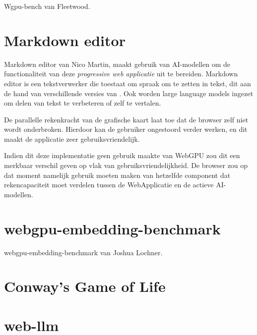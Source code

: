 Wgpu-bench van Fleetwood. \autocite{Fleetwood2023d}

\section{Markdown editor}

Markdown editor van Nico Martin, maakt gebruik van AI-modellen om de functionaliteit van deze \textit{progressive web applicatie} uit te bereiden. Markdown editor is een tekstverwerker die toestaat om spraak om te zetten in tekst, dit aan de hand van verschillende versies van \textcite{radford2022whisper}. Ook worden {large language models} ingezet om delen van tekst te verbeteren of zelf te vertalen. 

\bigbreak{}

De parallelle rekenkracht van de grafische kaart laat toe dat de browser zelf niet wordt onderbroken. Hierdoor kan de gebruiker ongestoord verder werken, en dit maakt de applicatie zeer gebruiksvriendelijk.

\bigbreak{}

Indien dit deze implementatie geen gebruik maakte van WebGPU zou dit een merkbaar verschil geven op vlak van gebruiksvriendelijkheid. De browser zou op dat moment namelijk gebruik moeten maken van hetzelfde component dat rekencapaciteit moet verdelen tussen de WebApplicatie en de actieve AI-modellen. \autocite{Martin2020}

\section{webgpu-embedding-benchmark}

webgpu-embedding-benchmark van Joshua Lochner. \autocite{Lochner2024}

\section{Conway's Game of Life}

\section{web-llm}